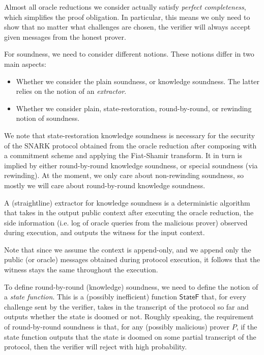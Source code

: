 Almost all oracle reductions we consider actually satisfy \emph{perfect completeness}, which
simplifies the proof obligation. In particular, this means we only need to show that no matter what challenges are chosen, the verifier will always accept given messages from the honest prover.

For soundness, we need to consider different notions. These notions differ in two main aspects:
\begin{itemize}
    \item Whether we consider the plain soundness, or knowledge soundness. The latter relies on the
    notion of an \emph{extractor}.
    \item Whether we consider plain, state-restoration, round-by-round, or rewinding notion of
    soundness.
\end{itemize}

We note that state-restoration knowledge soundness is necessary for the security of the SNARK
protocol obtained from the oracle reduction after composing with a commitment scheme and applying
the Fiat-Shamir transform. It in turn is implied by either round-by-round knowledge soundness, or
special soundness (via rewinding). At the moment, we only care about non-rewinding soundness, so mostly we will care about round-by-round knowledge soundness.

\begin{definition}[Soundness]
    \label{def:soundness}
\end{definition}

A (straightline) extractor for knowledge soundness is a deterministic algorithm that takes in the output public context after executing the oracle reduction, the side information (i.e. log of oracle queries from the malicious prover) observed during execution, and outputs the witness for the input context.

Note that since we assume the context is append-only, and we append only the public (or oracle)
messages obtained during protocol execution, it follows that the witness stays the same throughout
the execution.

\begin{definition}
    \label{def:knowledge_soundness}
\end{definition}

To define round-by-round (knowledge) soundness, we need to define the notion of a \emph{state function}. This is a (possibly inefficient) function $\mathsf{StateF}$ that, for every challenge sent by the verifier, takes in the transcript of the protocol so far and outputs whether the state is doomed or not. Roughly speaking, the requirement of round-by-round soundness is that, for any (possibly malicious) prover $P$, if the state function outputs that the state is doomed on some partial transcript of the protocol, then the verifier will reject with high probability.

